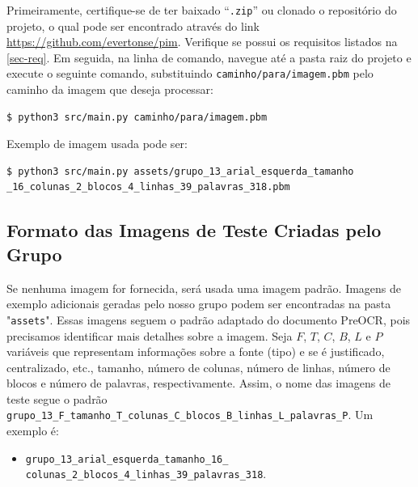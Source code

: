 \documentclass[english, 
               brazil, 
               bsc] %
               {dcomp-abntex2}
\begin{document}
Primeiramente, certifique-se de ter baixado ``\texttt{.zip}'' ou clonado o repositório do projeto, o qual pode ser encontrado através do link \url{https://github.com/evertonse/pim}. Verifique se possui os requisitos listados na \autoref{sec-req}. Em seguida, na linha de comando, navegue até a pasta raiz do projeto e execute o seguinte comando, substituindo \texttt{caminho/para/imagem.pbm} pelo caminho da imagem que deseja processar:


\begin{verbatim}
$ python3 src/main.py caminho/para/imagem.pbm
\end{verbatim}


Exemplo de imagem usada pode ser:
\begin{verbatim}
$ python3 src/main.py assets/grupo_13_arial_esquerda_tamanho
_16_colunas_2_blocos_4_linhas_39_palavras_318.pbm
\end{verbatim}


\subsection{Formato das Imagens de Teste Criadas pelo Grupo}
Se nenhuma imagem for fornecida, será usada uma imagem padrão. Imagens de exemplo adicionais geradas pelo nosso grupo podem ser encontradas na pasta "\texttt{assets}". Essas imagens seguem o padrão adaptado do documento PreOCR, pois precisamos identificar mais detalhes sobre a imagem. Seja $F$, $T$, $C$, $B$, $L$ e $P$ variáveis que representam informações sobre a fonte (tipo) e se é justificado, centralizado, etc., tamanho, número de colunas, número de linhas, número de blocos e número de palavras, respectivamente. Assim, o nome das imagens de teste segue o padrão \texttt{grupo\_13\_F\_tamanho\_T\_colunas\_C\_blocos\_B\_linhas\_L\_palavras\_P}. Um exemplo é:


\begin{itemize}
  \item \texttt{\small grupo\_13\_arial\_esquerda\_tamanho\_16\_
    colunas\_2\_blocos\_4\_linhas\_39\_palavras\_318}.
\end{itemize}
\end{document}
